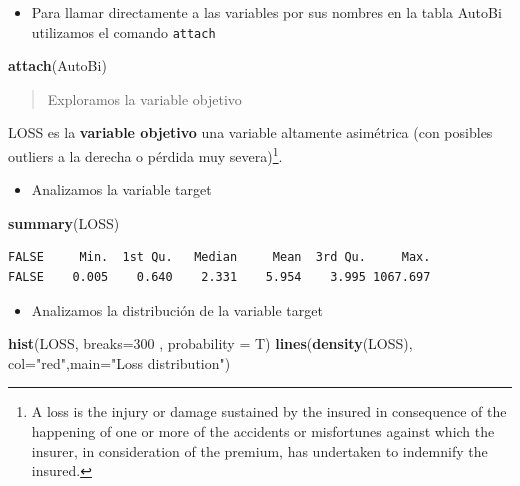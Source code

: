\documentclass[]{book}
\newenvironment{Shaded}{\begin{snugshade}}{\end{snugshade}}
\newcommand{\DataTypeTok}[1]{\textcolor[rgb]{0.13,0.29,0.53}{#1}}
\newcommand{\DecValTok}[1]{\textcolor[rgb]{0.00,0.00,0.81}{#1}}
\newcommand{\KeywordTok}[1]{\textcolor[rgb]{0.13,0.29,0.53}{\textbf{#1}}}
\newcommand{\NormalTok}[1]{#1}
\newcommand{\StringTok}[1]{\textcolor[rgb]{0.31,0.60,0.02}{#1}}
\providecommand{\tightlist}{%
  \setlength{\itemsep}{0pt}\setlength{\parskip}{0pt}}
\let\rmarkdownfootnote\footnote%
\def\footnote{\protect\rmarkdownfootnote}
\begin{document}
\begin{itemize}
\tightlist
\item
  Para llamar directamente a las variables por sus nombres en la tabla AutoBi utilizamos el comando \texttt{attach}
\end{itemize}

\begin{Shaded}
\begin{Highlighting}[]
\KeywordTok{attach}\NormalTok{(AutoBi)}
\end{Highlighting}
\end{Shaded}

\begin{quote}
Exploramos la variable objetivo
\end{quote}

LOSS es la \textbf{variable objetivo} una variable altamente asimétrica (con posibles outliers a la derecha o pérdida muy severa)\footnote{A loss is the injury or damage sustained by the insured in consequence of the happening of one or more of the accidents or misfortunes against which the insurer, in consideration of the premium, has undertaken to indemnify the insured.}.

\begin{itemize}
\tightlist
\item
  Analizamos la variable target
\end{itemize}

\begin{Shaded}
\begin{Highlighting}[]
\KeywordTok{summary}\NormalTok{(LOSS)}
\end{Highlighting}
\end{Shaded}

\begin{verbatim}
FALSE     Min.  1st Qu.   Median     Mean  3rd Qu.     Max. 
FALSE    0.005    0.640    2.331    5.954    3.995 1067.697
\end{verbatim}

\begin{itemize}
\tightlist
\item
  Analizamos la distribución de la variable target
\end{itemize}

\begin{Shaded}
\begin{Highlighting}[]
\KeywordTok{hist}\NormalTok{(LOSS, }\DataTypeTok{breaks=}\DecValTok{300}\NormalTok{ , }\DataTypeTok{probability =}\NormalTok{ T)}
\KeywordTok{lines}\NormalTok{(}\KeywordTok{density}\NormalTok{(LOSS), }\DataTypeTok{col=}\StringTok{"red"}\NormalTok{,}\DataTypeTok{main=}\StringTok{"Loss distribution"}\NormalTok{)}
\end{Highlighting}
\end{Shaded}
\end{document}
